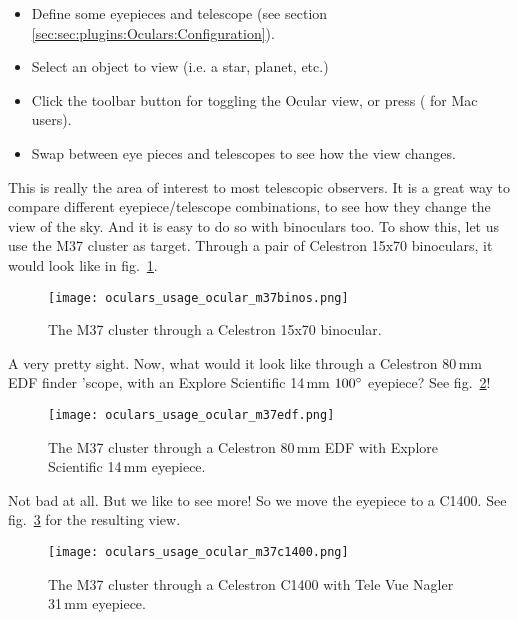 \begin{itemize}
\item Define some eyepieces and telescope (see section \ref{sec:sec:plugins:Oculars:Configuration}).
\item Select an object to view (i.e. a star, planet, etc.)
\item Click the toolbar button  for toggling the Ocular view, 
      or press  ( for Mac users).
\item Swap between eye pieces and telescopes to see how the view changes.
\end{itemize}

This is really the area of interest to most telescopic observers. 
It is a great way to compare different eyepiece/telescope combinations, to see how they change the view of the sky. 
And it is easy to do so with binoculars too. 
To show this, let us use the M37 cluster as target. Through a pair of Celestron 15x70 binoculars, it would look like in fig.~\ref{fig:plugins:Oculars:Usage:Ocular:M37Binos}.

\begin{figure}[h]\centering
\texttt{[image: oculars\_usage\_ocular\_m37binos.png]}
\caption{The M37 cluster through a Celestron 15x70 binocular.}
\label{fig:plugins:Oculars:Usage:Ocular:M37Binos}
\end{figure}

\noindent A very pretty sight. Now, what would it look like through a Celestron 80\,mm EDF finder 'scope, with an Explore Scientific 14\,mm $100\degree$ eyepiece? See fig.~\ref{fig:plugins:Oculars:Usage:Ocular:M37EDF}!

\begin{figure}[h]\centering
\texttt{[image: oculars\_usage\_ocular\_m37edf.png]}
\caption{The M37 cluster through a Celestron 80\,mm EDF with Explore Scientific 14\,mm eyepiece.}
\label{fig:plugins:Oculars:Usage:Ocular:M37EDF}
\end{figure}

\noindent Not bad at all. But we like to see more! So we move the eyepiece to a C1400. See fig.~\ref{fig:plugins:Oculars:Usage:Ocular:M37C1400} for the resulting view.


\begin{figure}[ht]\centering
\texttt{[image: oculars\_usage\_ocular\_m37c1400.png]}
\caption{The M37 cluster through a Celestron C1400 with Tele Vue Nagler 31\,mm eyepiece.}
\label{fig:plugins:Oculars:Usage:Ocular:M37C1400}
\end{figure}

